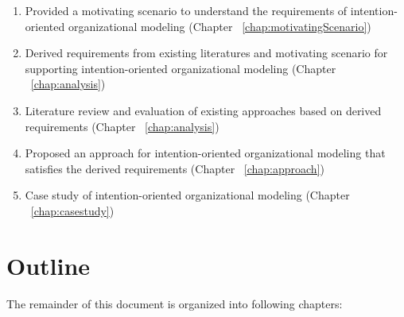 \begin{enumerate}
	\item Provided a motivating scenario to understand the requirements of intention-oriented organizational modeling (Chapter ~\ref{chap:motivatingScenario})
 	\item Derived requirements from existing literatures and motivating scenario for supporting intention-oriented organizational modeling (Chapter  ~\ref{chap:analysis})
 	\item Literature review and evaluation of existing approaches based on derived requirements (Chapter ~\ref{chap:analysis})
 	\item Proposed an approach for intention-oriented organizational modeling that satisfies the derived requirements (Chapter ~\ref{chap:approach})
 	\item Case study of intention-oriented organizational modeling (Chapter ~\ref{chap:casestudy})
\end{enumerate}
 
\section{Outline}
\label{sec:outline}
The remainder of this document is organized into following chapters:

